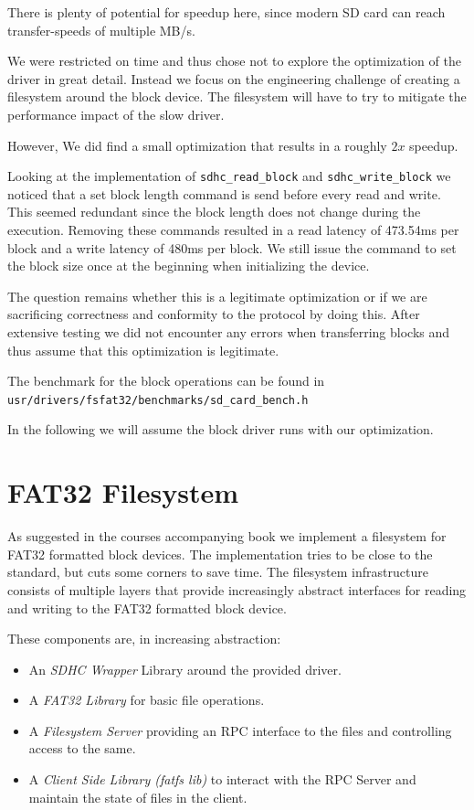 There is plenty of potential for speedup here, since modern SD card can reach transfer-speeds of multiple MB/s. 

We were restricted on time and thus chose not to explore the optimization of the
driver in great detail.
Instead we focus on the engineering challenge of creating a filesystem around the block device.
The filesystem will have to try to mitigate the performance impact of the slow driver.

However, We did find a small optimization that results in a roughly $2x$
speedup.

Looking at the implementation of \texttt{sdhc_read_block} and \texttt{sdhc_write_block} we noticed that a set block length command is send before every read and write.
This seemed redundant since the block length does not change during the
execution.
Removing these commands resulted in a read latency of 473.54ms per block and a
write latency of 480ms per block.
We still issue the command to set the block size once at the beginning when initializing the device.

The question remains whether this is a legitimate optimization or if we are sacrificing correctness and conformity to the protocol by doing this.
After extensive testing we did not encounter any errors when transferring blocks and thus assume that this optimization is legitimate. 

The benchmark for the block operations can be found in \texttt{usr/drivers/fsfat32/benchmarks/sd_card_bench.h}

In the following we will assume the block driver runs with our optimization.

\section{FAT32 Filesystem}

As suggested in the courses accompanying book we implement a filesystem for FAT32 formatted block devices.
The implementation tries to be close to the standard, but cuts some corners to save time.
The filesystem infrastructure consists of multiple layers that provide increasingly abstract interfaces for reading and writing to the FAT32 formatted block device.

These components are, in increasing abstraction:
\begin{itemize}
    \item An \textit{SDHC Wrapper} Library around the provided driver.
    \item A \textit{FAT32 Library} for basic file operations.
    \item A \textit{Filesystem Server} providing an RPC interface to the files and controlling access to the same.
    \item A \textit{Client Side Library (fatfs lib)} to interact with the RPC Server and maintain the state of files in the client.
\end{itemize}

